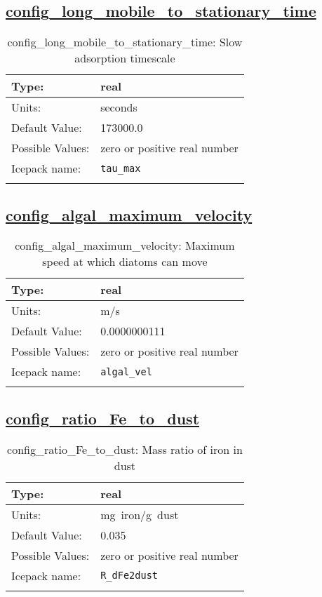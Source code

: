 \subsection[config\_long\_mobile\_to\_stationary\_time]{\hyperref[sec:nm_tab_biogeochemistry]{config\_long\_mobile\_to\_stationary\_time}}
\label{subsec:nm_sec_config_long_mobile_to_stationary_time}
\begin{center}
\begin{longtable}{| p{2.0in} || p{4.0in} |}
    \hline
    Type: & real \\
    \hline
    Units: & \si{seconds} \\
    \hline
    Default Value: & 173000.0 \\
    \hline
    Possible Values: & zero or positive real number \\
    \hline
    \hline
    Icepack name: & \verb+tau_max+ \\
    \caption{config\_long\_mobile\_to\_stationary\_time: Slow adsorption timescale}
\end{longtable}
\end{center}
\subsection[config\_algal\_maximum\_velocity]{\hyperref[sec:nm_tab_biogeochemistry]{config\_algal\_maximum\_velocity}}
\label{subsec:nm_sec_config_algal_maximum_velocity}
\begin{center}
\begin{longtable}{| p{2.0in} || p{4.0in} |}
    \hline
    Type: & real \\
    \hline
    Units: & \si{m/s} \\
    \hline
    Default Value: & 0.0000000111 \\
    \hline
    Possible Values: & zero or positive real number  \\
    \hline
    \hline
    Icepack name: & \verb+algal_vel+ \\
    \caption{config\_algal\_maximum\_velocity: Maximum speed at which diatoms can move}
\end{longtable}
\end{center}
\subsection[config\_ratio\_Fe\_to\_dust]{\hyperref[sec:nm_tab_biogeochemistry]{config\_ratio\_Fe\_to\_dust}}
\label{subsec:nm_sec_config_ratio_Fe_to_dust}
\begin{center}
\begin{longtable}{| p{2.0in} || p{4.0in} |}
    \hline
    Type: & real \\
    \hline
    Units: & \si{mg.iron/g.dust} \\
    \hline
    Default Value: & 0.035 \\
    \hline
    Possible Values: & zero or positive real number \\
    \hline
    \hline
    Icepack name: & \verb+R_dFe2dust+ \\
    \caption{config\_ratio\_Fe\_to\_dust: Mass ratio of iron in dust}
\end{longtable}
\end{center}
